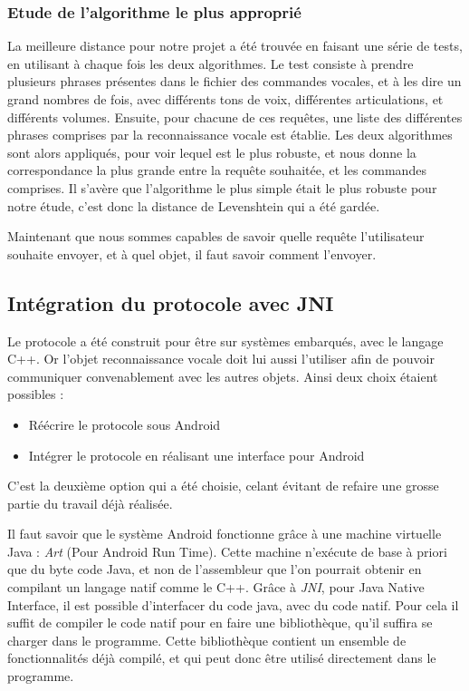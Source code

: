 \subsubsection{Etude de l'algorithme le plus approprié}
La meilleure distance pour notre projet a été trouvée en faisant une série de tests, en utilisant à chaque 
fois les deux algorithmes. Le test consiste à prendre plusieurs phrases présentes dans le fichier des 
commandes vocales, et à les dire un grand nombres de fois, avec différents tons de voix, 
différentes 
articulations, et différents volumes. Ensuite, pour chacune de ces requêtes, une liste des différentes 
phrases comprises par la reconnaissance vocale est établie. Les deux algorithmes sont alors appliqués, pour 
voir lequel est le plus robuste, et nous donne la correspondance la plus grande entre la requête souhaitée, et 
les commandes comprises. Il s'avère que l'algorithme le plus simple  était le plus robuste pour notre étude, 
c'est donc la distance de Levenshtein qui a été gardée. 

Maintenant que nous sommes capables de savoir quelle requête l'utilisateur souhaite envoyer, et à quel objet, 
il faut savoir comment l'envoyer.

	\subsection{Intégration du protocole avec JNI}
Le protocole a été construit pour être sur systèmes embarqués, avec le langage C++. Or l'objet reconnaissance 
vocale doit lui aussi l'utiliser afin de pouvoir communiquer convenablement avec les autres objets. Ainsi deux 
choix étaient possibles :
\begin{itemize}
 \item Réécrire le protocole sous Android
 \item Intégrer le protocole en réalisant une interface pour Android
\end{itemize}

C'est la deuxième option qui a été choisie, celant évitant de refaire une grosse partie du travail déjà 
réalisée.

Il faut savoir que le système Android fonctionne grâce à une machine virtuelle Java : \emph{Art} (Pour 
Android Run Time). Cette machine n'exécute de base à priori que du byte code Java, et non de l'assembleur que 
l'on pourrait obtenir en compilant un langage natif comme le C++. Grâce à \emph{JNI}, pour Java Native 
Interface, il est possible d'interfacer du code java, avec du code natif. Pour cela il suffit de compiler le 
code natif pour en faire une bibliothèque, qu'il suffira se charger dans le programme. Cette 
bibliothèque
contient un ensemble de fonctionnalités déjà compilé, et qui peut donc être utilisé directement dans le 
programme.

